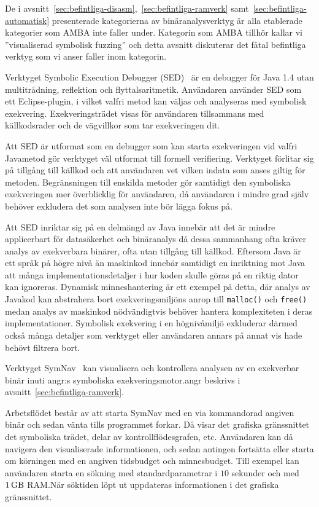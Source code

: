 De i avsnitt~\ref{sec:befintliga-disasm},\ \ref{sec:befintliga-ramverk} samt\
\ref{sec:befintliga-automatisk} presenterade kategorierna av binäranalysverktyg
är alla etablerade kategorier som AMBA inte faller under. Kategorin som AMBA
tillhör kallar vi ''visualiserad symbolisk fuzzing'' och detta avsnitt
diskuterar det fåtal befintliga verktyg som vi anser faller inom kategorin.

Verktyget Symbolic Execution Debugger
(\textsc{SED})~\cite{symbolic_execution_debugger} är en debugger för Java 1.4
utan multitrådning, reflektion och flyttalsaritmetik. Användaren använder
\textsc{SED} som ett Eclipse-plugin, i vilket valfri metod kan väljas och
analyseras med symbolisk exekvering. Exekveringsträdet visas för användaren
tillsammans med källkodsrader och de vägvillkor som tar exekveringen dit.

Att \textsc{SED} är utformat som en debugger som kan starta exekveringen vid
valfri Javametod gör verktyget väl utformat till formell verifiering. Verktyget
förlitar sig på tillgång till källkod och att användaren vet vilken indata som
anses giltig för metoden. Begränsningen till enskilda metoder gör samtidigt den
symboliska exekveringen mer överblicklig för användaren, då användaren i mindre
grad själv behöver exkludera det som analysen inte bör lägga fokus på.

Att \textsc{SED} inriktar sig på en delmängd av Java innebär att det är mindre
applicerbart för datasäkerhet och binäranalys då dessa sammanhang ofta kräver
analys av exekverbara binärer, ofta utan tillgång till källkod. Eftersom Java är
ett språk på högre nivå än maskinkod innebär samtidigt en inriktning mot Java
att många implementationsdetaljer i hur koden skulle göras på en riktig dator
kan ignoreras. Dynamisk minneshantering är ett exempel på detta, där analys av
Javakod kan abstrahera bort exekveringsmiljöns anrop till \verb|malloc()| och
\verb|free()| medan analys av maskinkod nödvändigtvis behöver hantera
komplexiteten i deras implementationer. Symbolisk exekvering i en högnivåmiljö
exkluderar därmed också många detaljer som verktyget eller användaren annars på
annat vis hade behövt filtrera bort.

Verktyget SymNav~\cite{symnav} kan visualisera och kontrollera analysen av en
exekverbar binär inuti angr:s symboliska exekveringsmotor.\@ angr beskrivs i
avsnitt~\ref{sec:befintliga-ramverk}.

Arbetsflödet består av att starta SymNav med en via kommandorad angiven binär
och sedan vänta tills programmet forkar. Då visar det grafiska gränssnittet det
symboliska trädet, delar av kontrollflödesgrafen, etc. Användaren kan då
navigera den visualiserade informationen, och sedan antingen fortsätta eller
starta om körningen med en angiven tidsbudget och minnesbudget. Till exempel kan
användaren starta en sökning med standardparametrar i $10$ sekunder och med
$\SI{1}{\giga\byte}$ RAM.\@ När söktiden löpt ut uppdateras informationen i
det grafiska gränssnittet.

